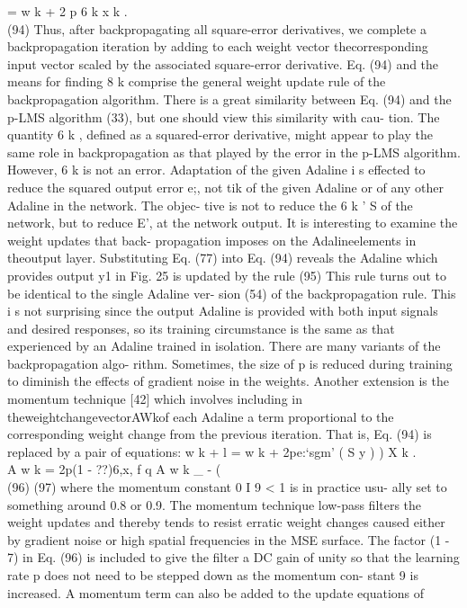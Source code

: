 = w k + 2 p 6 k x k .\\
(94) Thus, after backpropagating all square-error derivatives, we
complete a backpropagation iteration by adding to each weight vector
thecorresponding input vector scaled by the associated square-error
derivative. Eq. (94) and the means for finding 8 k comprise the general
weight update rule of the backpropagation algorithm. There is a great
similarity between Eq. (94) and the p-LMS algorithm (33), but one should
view this similarity with cau- tion. The quantity 6 k , defined as a
squared-error derivative, might appear to play the same role in
backpropagation as that played by the error in the p-LMS algorithm.
However, 6 k is not an error. Adaptation of the given Adaline i s
effected to reduce the squared output error e;, not tik of the given
Adaline or of any other Adaline in the network. The objec- tive is not
to reduce the 6 k ' S of the network, but to reduce E', at the network
output. It is interesting to examine the weight updates that back-
propagation imposes on the Adalineelements in theoutput layer.
Substituting Eq. (77) into Eq. (94) reveals the Adaline which provides
output y1 in Fig. 25 is updated by the rule (95) This rule turns out to
be identical to the single Adaline ver- sion (54) of the backpropagation
rule. This i s not surprising since the output Adaline is provided with
both input signals and desired responses, so its training circumstance
is the same as that experienced by an Adaline trained in isolation.
There are many variants of the backpropagation algo- rithm. Sometimes,
the size of p is reduced during training to diminish the effects of
gradient noise in the weights. Another extension is the momentum
technique {[}42{]} which involves including in
theweightchangevectorAWkof each Adaline a term proportional to the
corresponding weight change from the previous iteration. That is, Eq.
(94) is replaced by a pair of equations: w k + l = w k + 2pe:`sgm' ( S y
) ) X k .\\
A w k = 2p(1 - ??)6,x, f q A w k \_ - (\\
(96) (97) where the momentum constant 0 I 9 \textless{} 1 is in practice
usu- ally set to something around 0.8 or 0.9. The momentum technique
low-pass filters the weight updates and thereby tends to resist erratic
weight changes caused either by gradient noise or high spatial
frequencies in the MSE surface. The factor (1 - 7) in Eq. (96) is
included to give the filter a DC gain of unity so that the learning rate
p does not need to be stepped down as the momentum con- stant 9 is
increased. A momentum term can also be added to the update equations of
